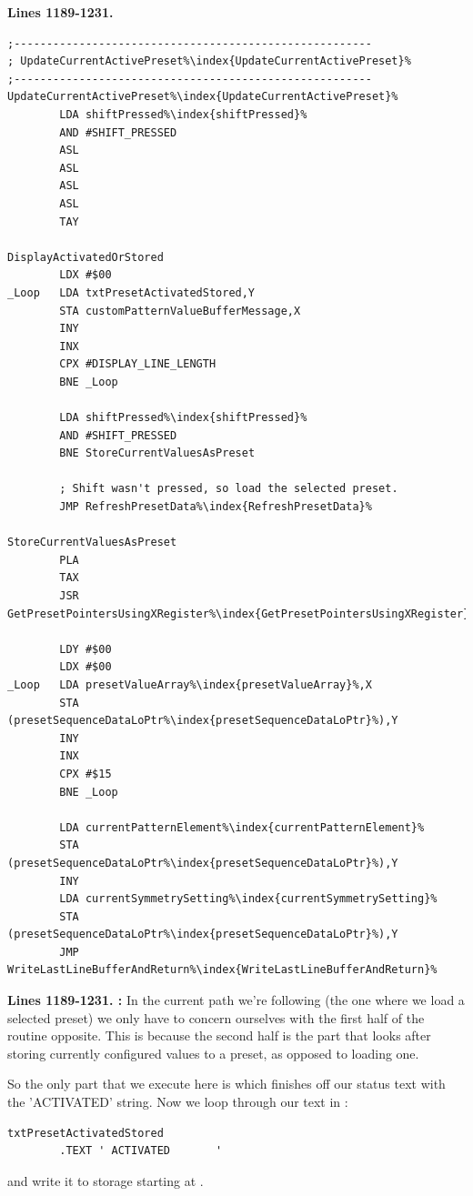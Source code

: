 \clearpage
\textbf{Lines 1189-1231. } 
\begin{lstlisting}[escapechar=\%]
;-------------------------------------------------------
; UpdateCurrentActivePreset%\index{UpdateCurrentActivePreset}%
;-------------------------------------------------------
UpdateCurrentActivePreset%\index{UpdateCurrentActivePreset}%    
        LDA shiftPressed%\index{shiftPressed}%
        AND #SHIFT_PRESSED
        ASL 
        ASL 
        ASL 
        ASL 
        TAY 

DisplayActivatedOrStored
        LDX #$00
_Loop   LDA txtPresetActivatedStored,Y
        STA customPatternValueBufferMessage,X
        INY 
        INX 
        CPX #DISPLAY_LINE_LENGTH
        BNE _Loop

        LDA shiftPressed%\index{shiftPressed}%
        AND #SHIFT_PRESSED
        BNE StoreCurrentValuesAsPreset

        ; Shift wasn't pressed, so load the selected preset.
        JMP RefreshPresetData%\index{RefreshPresetData}%

StoreCurrentValuesAsPreset   
        PLA 
        TAX 
        JSR GetPresetPointersUsingXRegister%\index{GetPresetPointersUsingXRegister}%

        LDY #$00
        LDX #$00
_Loop   LDA presetValueArray%\index{presetValueArray}%,X
        STA (presetSequenceDataLoPtr%\index{presetSequenceDataLoPtr}%),Y
        INY 
        INX 
        CPX #$15
        BNE _Loop

        LDA currentPatternElement%\index{currentPatternElement}%
        STA (presetSequenceDataLoPtr%\index{presetSequenceDataLoPtr}%),Y
        INY 
        LDA currentSymmetrySetting%\index{currentSymmetrySetting}%
        STA (presetSequenceDataLoPtr%\index{presetSequenceDataLoPtr}%),Y
        JMP WriteLastLineBufferAndReturn%\index{WriteLastLineBufferAndReturn}%
\end{lstlisting}
\clearpage

\textbf{Lines 1189-1231. :} In the current path we're following (the one where we load a selected preset)
we only have to concern ourselves with the first half of the routine opposite. This is because the second half is the part that looks after storing
currently configured values to a preset, as opposed to loading one.

So the only part that we execute here is  which finishes off our status text with the 'ACTIVATED' string. Now we loop
through our text in :
\begin{lstlisting}[escapechar=\%]
txtPresetActivatedStored
        .TEXT ' ACTIVATED       '
\end{lstlisting}
and write it to storage starting at . 


